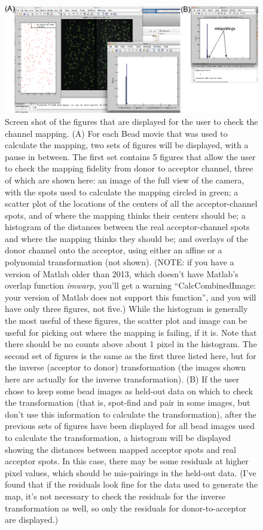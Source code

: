 \documentclass[11pt]{article}
\begin{document}
\begin{figure}
\begin{center}
\includegraphics[width=6.5in]{ScreenShots/CheckMap.eps}
\caption{Screen shot of the figures that are displayed for the user to check the channel mapping. (A) For each Bead movie that was used to calculate the mapping, two sets of figures will be displayed, with a pause in between.  The first set contains 5 figures that allow the user to check the mapping fidelity from donor to acceptor channel, three of which are shown here: an image of the full view of the camera, with the spots used to calculate the mapping circled in green; a scatter plot of the locations of the centers of all the acceptor-channel spots, and of where the mapping thinks their centers should be; a histogram of the distances between the real acceptor-channel spots and where the mapping thinks they should be; and overlays of the donor channel onto the acceptor, using either an affine or a polynomial transformation (not shown).  (NOTE: if you have a version of Matlab older than 2013, which doesn't have Matlab's overlap function {\it imwarp}, you'll get a warning ``CalcCombinedImage: your version of Matlab does not support this function'', and you will have only three figures, not five.) While the histogram is generally the most useful of these figures, the scatter plot and image can be useful for picking out where the mapping is failing, if it is.  Note that there should be no counts above about 1 pixel in the histogram. The second set of figures is the same as the first three listed here, but for the inverse (acceptor to donor) transformation (the images shown here are actually for the inverse transformation). (B) If the user chose to keep some bead images as held-out data on which to check the transformation (that is, spot-find and pair in some images, but don't use this information to calculate the transformation), after the previous sets of figures have been displayed for all bead images used to calculate the transformation, a histogram will be displayed showing the distances between mapped acceptor spots and real acceptor spots.  In this case, there may be some residuals at higher pixel values, which should be mis-pairings in the held-out data. (I've found that if the residuals look fine for the data used to generate the map, it's not necessary to check the residuals for the inverse transformation as well, so only the residuals for donor-to-acceptor are displayed.) }
\label{fig:MapCheckShot}
\end{center}
\end{figure}
\end{document}
